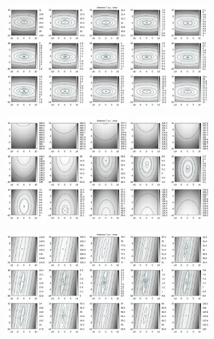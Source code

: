 \begin{appendix}
\begin{figure}[!ht]
\begin{subfigure}[t]{0.3\textwidth}
	\end{subfigure}
\\
	\centering
	\begin{subfigure}[t]{0.3\textwidth}
	     \centering
	     \includegraphics[width=\textwidth]{img/fitness/xy/a7.png}
	\end{subfigure}
	\begin{subfigure}[t]{0.3\textwidth}
		\centering
	     \includegraphics[width=\textwidth]{img/fitness/xz/a7.png}
	\end{subfigure}
	\begin{subfigure}[t]{0.3\textwidth}
			\centering
	   \includegraphics[width=\textwidth]{img/fitness/yz/a7.png}

\end{subfigure}
\end{figure}
\end{appendix}

